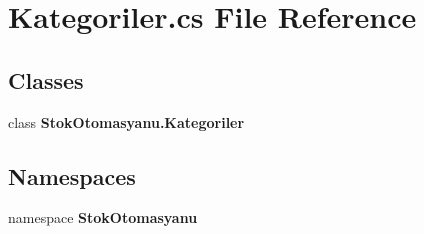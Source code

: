 \section{Kategoriler.\+cs File Reference}
\label{_kategoriler_8cs}
\subsection*{Classes}
\begin{DoxyCompactItemize}
\item 
class \textbf{ Stok\+Otomasyanu.\+Kategoriler}
\end{DoxyCompactItemize}
\subsection*{Namespaces}
\begin{DoxyCompactItemize}
\item 
namespace \textbf{ Stok\+Otomasyanu}
\end{DoxyCompactItemize}
